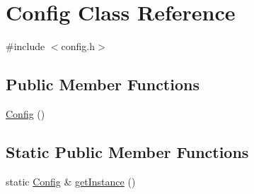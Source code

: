 \hypertarget{class_config}{\section{Config Class Reference}
\label{class_config}
}


{\ttfamily \#include $<$config.\-h$>$}

\subsection*{Public Member Functions}
\begin{DoxyCompactItemize}
\item 
\hyperlink{class_config_abd0c571c116924871e30444b192b792a}{Config} ()
\end{DoxyCompactItemize}
\subsection*{Static Public Member Functions}
\begin{DoxyCompactItemize}
\item 
static \hyperlink{class_config}{Config} \& \hyperlink{class_config_a52ae1e3685e26ba3689691b627d33647}{get\-Instance} ()
\end{DoxyCompactItemize}

